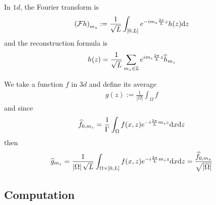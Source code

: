 \documentclass[11pt,a4paper,reqno,french,tikz]{amsart}
\def\d{{\rm d}}
\newcommand{\pa}[1]{\left( #1 \right)} %
\newcommand{\ab}[1]{\left|#1\right|} %
\newcommand{\f}[2]{\frac{#1}{#2}} %
\begin{document}
In $1d$, the Fourier transform is
\begin{align*}
\pa{\cF h}_{m_z} := \f{1}{\sqrt L} \int_{[0,L]} e^{-im_z \f{2\pi}{L} z} h(z) \d z
\end{align*}
and the reconstruction formula is
\begin{align*}
	h(z) =  \f{1}{\sqrt L}\sum_{\substack{m_z \in \Z}}  e^{i m_z \f{2\pi}L z} \widehat{h}_{m_z}
\end{align*}

 We take a function $f$ in $3d$ and define its average
\begin{align*}
g(z) := \f{1}{\ab{\Omega}} \int_\Omega f
\end{align*}
and since
\begin{align*}
\widehat{f}_{0,m_z} = \f{1}{\Gamma} \int_\Omega f(x,z) e^{-i\f{2\pi}{L} m_z z} \d x \d z
\end{align*}
then
\begin{align*}
\widehat{g}_{m_z} = \f{1}{\ab{\Omega} \sqrt{L}} \int_{\Omega \times [0,L]} f(x,z) e^{-i\f{2\pi}{L} m_z z} \d x \d z = \f{\widehat{f}_{0,m_z}}{\sqrt{\ab{\Omega}}}
\end{align*}

\subsection{Computation}%
\label{sub:Computation}
\end{document}
